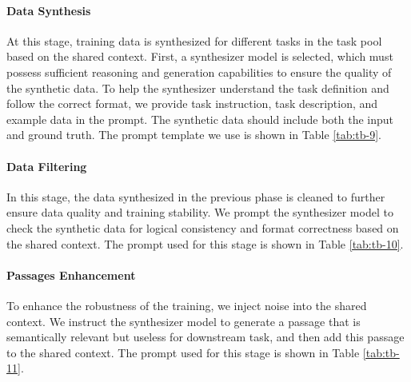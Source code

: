 \documentclass[11pt]{article}
\begin{document}
\paragraph{Data Synthesis} At this stage, training data is synthesized for different tasks in the task pool based on the shared context. First, a synthesizer model is selected, which must possess sufficient reasoning and generation capabilities to ensure the quality of the synthetic data. To help the synthesizer understand the task definition and follow the correct format, we provide task instruction, task description, and example data in the prompt. The synthetic data should include both the input and ground truth. The prompt template we use is shown in Table \ref{tab:tb-9}.

\paragraph{Data Filtering} In this stage, the data synthesized in the previous phase is cleaned to further ensure data quality and training stability. We prompt the synthesizer model to check the synthetic data for logical consistency and format correctness based on the shared context. The prompt used for this stage is shown in Table \ref{tab:tb-10}.

\paragraph{Passages Enhancement} To enhance the robustness of the training, we inject noise into the shared context. We instruct the synthesizer model to generate a passage that is semantically relevant but useless for downstream task, and then add this passage to the shared context. The prompt used for this stage is shown in Table \ref{tab:tb-11}.
\end{document}
